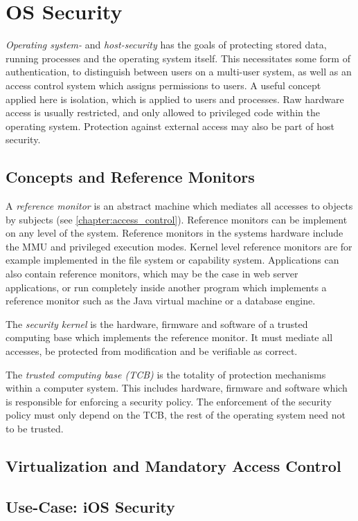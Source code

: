 \chapter{OS Security}
\textit{Operating system-} and \emph{host-security} has the goals of protecting
stored data, running processes and the operating system itself. This
necessitates some form of authentication, to distinguish between users on a
multi-user system, as well as an access control system which assigns permissions
to users. A useful concept applied here is isolation, which is applied to users
and processes. Raw hardware access is usually restricted, and only allowed to
privileged code within the operating system. Protection against external access
may also be part of host security.

\section{Concepts and Reference Monitors}
A \emph{reference monitor} is an abstract machine which mediates all accesses to
objects by subjects (see \cref{chapter:access_control}). Reference monitors can
be implement on any level of the system. Reference monitors in the systems
hardware include the MMU and privileged execution modes. Kernel level reference
monitors are for example implemented in the file system or capability system.
Applications can also contain reference monitors, which may be the case in web
server applications, or run completely inside another program which implements a
reference monitor such as the Java virtual machine or a database engine.

The \emph{security kernel} is the hardware, firmware and software of a trusted
computing base which implements the reference monitor. It must mediate all
accesses, be protected from modification and be verifiable as correct.

The \emph{trusted computing base (TCB)} is the totality of protection mechanisms
within a computer system. This includes hardware, firmware and software which is
responsible for enforcing a security policy. The enforcement of the security
policy must only depend on the TCB, the rest of the operating system need not to
be trusted.

\section{Virtualization and Mandatory Access Control}
\section{Use-Case: iOS Security}
